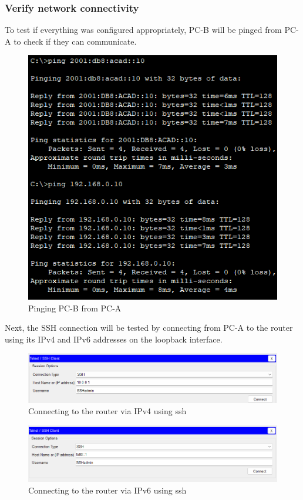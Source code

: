 \documentclass[a4paper]{article}
\newcommand{\abc}{\hfill \break}
\begin{document}
\subsubsection{Verify network connectivity}
To test if everything was configured appropriately, PC-B will be pinged from PC-A to check if they can communicate.
\begin{figure}[h]
	\includegraphics[scale=0.45]{images/pingpcb.png}
	\centering
	\caption{Pinging PC-B from PC-A}
\end{figure}\abc
Next, the SSH connection will be tested by connecting from PC-A to the router using its IPv4 and IPv6 addresses on the loopback interface.
\begin{figure}[h]
	\includegraphics[scale=0.45]{images/ipv4ssh.png}
	\centering
	\caption{Connecting to the router via IPv4 using ssh}
\end{figure}\abc
\begin{figure}[h]
	\includegraphics[scale=0.45]{images/ipv6ssh.png}
	\centering
	\caption{Connecting to the router via IPv6 using ssh}
\end{figure}\abc
\end{document}
